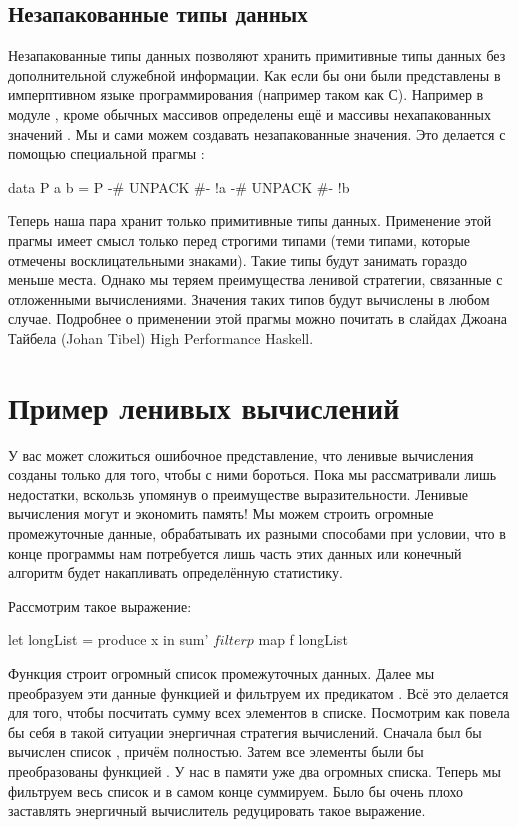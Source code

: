 \subsection{Незапакованные типы данных}

Незапакованные типы данных позволяют хранить примитивные
типы данных без дополнительной служебной информации.
Как если бы они были представлены в имперптивном языке 
программирования (например таком как С). Например в
модуле , кроме обычных массивов  
определены ещё и массивы нехапакованных значений .
Мы и сами можем создавать незапакованные значения. 
Это делается с помощью специальной прагмы :

\begin{code}
data P a b = P {-# UNPACK #-} !a 
               {-# UNPACK #-} !b
\end{code}

Теперь наша пара хранит только примитивные типы данных.
Применение этой прагмы имеет смысл только перед строгими типами
(теми типами, которые отмечены восклицательными знаками).
Такие типы будут занимать гораздо меньше места. Однако
мы теряем преимущества ленивой стратегии, связанные с 
отложенными вычислениями. Значения таких типов
будут вычислены в любом случае. Подробнее о применении
этой прагмы можно почитать в слайдах Джоана Тайбела (Johan Tibel) 
High Performance Haskell.


\section{Пример ленивых вычислений}

У вас может сложиться ошибочное представление, 
что ленивые вычисления созданы только для того,
чтобы с ними бороться. Пока мы рассматривали лишь недостатки,
вскользь упомянув о преимуществе выразительности. 
Ленивые вычисления могут и экономить память! 
Мы можем строить огромные промежуточные данные,
обрабатывать их разными способами при условии, что 
в конце программы нам потребуется лишь часть
этих данных или конечный алгоритм будет накапливать
определённую статистику. 

Рассмотрим такое выражение:

\begin{code}
let longList = produce x
in  sum' $ filter p $ map f longList 
\end{code}

Функция  строит огромный список промежуточных данных.
Далее мы преобразуем эти данные функцией  и фильтруем их
предикатом . Всё это делается для того, чтобы посчитать
сумму всех элементов в списке. Посмотрим как повела бы
себя в такой ситуации энергичная стратегия вычислений. 
Сначала был бы вычислен список , причём полностью.
Затем все элементы были бы преобразованы функцией .
У нас в памяти уже два огромных списка. Теперь мы фильтруем
весь список и в самом конце суммируем. Было бы очень 
плохо заставлять энергичный вычислитель редуцировать такое 
выражение. 

